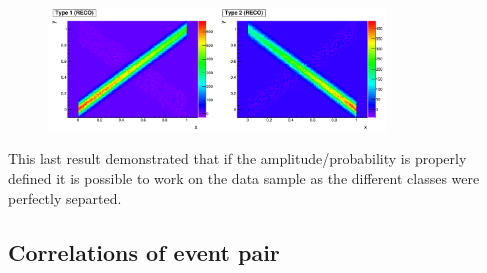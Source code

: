 \begin{figure}[!htb]
\centering
\includegraphics[width=0.8\textwidth]{../png/figRecoCorr.png}
\caption{}
\label{fig:RecoEx2}
\end{figure}

This last result demonstrated that if the amplitude/probability is properly
defined it is possible to work on the data sample as the different classes were
perfectly separted.


\subsection{Correlations of event pair}

\newpage
